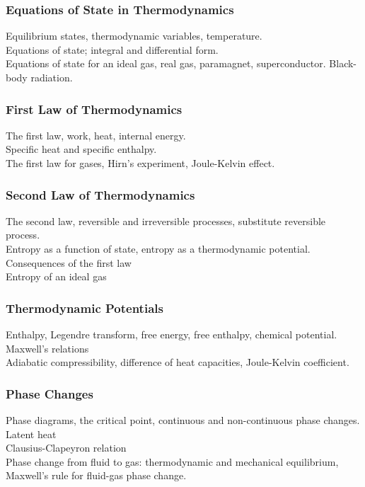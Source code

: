 \documentclass[11pt, a4paper]{article}
\begin{document}
\subsubsection{Equations of State in Thermodynamics}
Equilibrium states, thermodynamic variables, temperature.\\
Equations of state; integral and differential form.\\
Equations of state for an ideal gas, real gas, paramagnet, superconductor. Black-body radiation.

\subsubsection{First Law of Thermodynamics}
The first law, work, heat, internal energy. \\
Specific heat and specific enthalpy.\\
The first law for gases, Hirn's experiment, Joule-Kelvin effect.

\subsubsection{Second Law of Thermodynamics}
The second law, reversible and irreversible processes, substitute reversible process.\\ Entropy as a function of state, entropy as a thermodynamic potential. \\
Consequences of the first law\\
Entropy of an ideal gas

\subsubsection{Thermodynamic Potentials}
Enthalpy, Legendre transform, free energy, free enthalpy, chemical potential.\\
Maxwell's relations\\
Adiabatic compressibility, difference of heat capacities, Joule-Kelvin coefficient.

\subsubsection{Phase Changes}
Phase diagrams, the critical point, continuous and non-continuous phase changes.\\
Latent heat\\
Clausius-Clapeyron relation\\
Phase change from fluid to gas: thermodynamic and mechanical equilibrium, Maxwell's rule for fluid-gas phase change.
\end{document}
